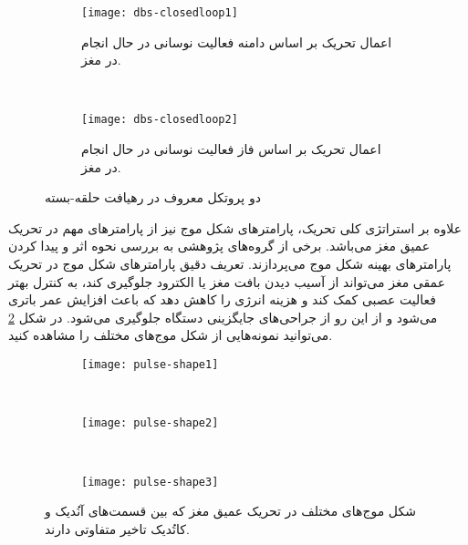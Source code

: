 \begin{figure}[t!]
     \centering
     \begin{subfigure}[t]{0.45\textwidth}
         \centering
         \texttt{[image: dbs-closedloop1]}
         \caption{
 اعمال تحریک بر اساس دامنه فعالیت نوسانی در حال انجام در مغز.
         }
     \end{subfigure}
     \
     \begin{subfigure}[t]{0.45\textwidth}
         \centering
         \texttt{[image: dbs-closedloop2]}
         \caption{
 اعمال تحریک بر اساس فاز فعالیت نوسانی در حال انجام در مغز.
         }
     \end{subfigure}
        \caption{
دو پروتکل معروف در رهیافت حلقه-بسته
         }
        \label{fig:dbs-closed-loop}
\end{figure}



علاوه بر استراتژی کلی تحریک، پارامترهای شکل موج نیز از پارامترهای مهم در تحریک عمیق مغز می‌باشد. برخی از گروه‌های پژوهشی به بررسی نحوه اثر و پیدا کردن پارامترهای بهینه شکل موج می‌پردازند. تعریف دقیق پارامترهای شکل موج در تحریک عمقی مغز می‌تواند از آسیب دیدن بافت مغز یا الکترود جلوگیری کند، به کنترل بهتر فعالیت عصبی کمک کند و هزینه انرژی را کاهش دهد که باعث افزایش عمر باتری می‌شود و از این رو از جراحی‌های جایگزینی دستگاه جلوگیری می‌شود. در شکل 
\ref{fig:dbs-pulse-shape}
می‌توانید نمونه‌هایی از شکل موج‌های مختلف را مشاهده کنید. 


\begin{figure}[b!]
     \centering
     \begin{subfigure}[t]{0.3\textwidth}
         \centering
         \texttt{[image: pulse-shape1]}
     \end{subfigure}
     \
     \begin{subfigure}[t]{0.3\textwidth}
         \centering
         \texttt{[image: pulse-shape2]}
     \end{subfigure}
     \
     \begin{subfigure}[t]{0.3\textwidth}
         \centering
         \texttt{[image: pulse-shape3]}
     \end{subfigure}
        \caption{
شکل موج‌های مختلف در تحریک عمیق مغز که بین قسمت‌های آنُدیک و کاتُدیک تاخیر متفاوتی دارند.
         }
        \label{fig:dbs-pulse-shape}
\end{figure}



